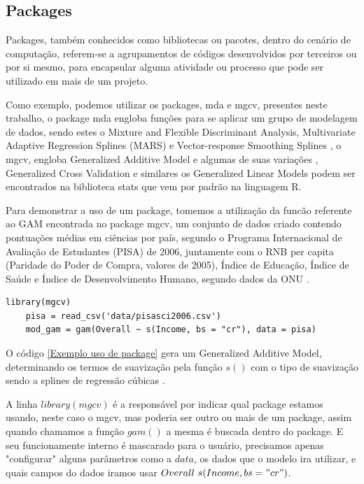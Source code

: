 \documentclass[
	12pt,				%
	openright,			%
	oneside,			%
	a4paper,			%
	english,			%
	brazil				%
	]{abntex2}
\begin{document}
\subsection{Packages}

Packages, também conhecidos como bibliotecas ou pacotes, dentro do cenário de computação, referem-se a agrupamentos de códigos 
desenvolvidos por terceiros ou por si mesmo, para encapsular alguma atividade ou processo que pode ser utilizado em mais de um projeto.

Como exemplo, podemos utilizar os packages, mda e mgcv, presentes neste trabalho, o package mda engloba funções para se aplicar
um grupo de modelagem de dados, sendo estes o Mixture and Flexible Discriminant Analysis, Multivariate Adaptive Regression 
Splines (MARS) e Vector-response Smoothing Splines \cite{mda}, o mgcv, engloba Generalized Additive Model e algumas de suas variações
, Generalized Cross Validation e similares \cite{mgcv} os Generalized Linear Models podem ser encontrados na biblioteca stats que
vem por padrão na linguagem R.

Para demonstrar a uso de um package, tomemos a utilização da funcão referente ao GAM encontrada no package mgcv, um conjunto de dados
criado contendo pontuações médias em ciências por país, segundo o Programa Internacional de Avaliação de Estudantes (PISA) de 2006,
juntamente com o RNB per capita (Paridade do Poder de Compra, valores de 2005), Índice de Educação, Índice de Saúde e 
Índice de Desenvolvimento Humano, segundo dados da ONU \cite{gam_exemplo}.

\lstset{style=r_code}
\begin{lstlisting}[caption={\label{Exemplo uso de package}Exemplo uso de package}]
	library(mgcv)
	pisa = read_csv('data/pisasci2006.csv')
	mod_gam = gam(Overall ~ s(Income, bs = "cr"), data = pisa)
\end{lstlisting}

O código \ref{Exemplo uso de package} gera um Generalized Additive Model, determinando os termos de suavização pela função $s()$ com o
tipo de suavização sendo a splines de regressão cúbicas \cite{gam_exemplo}. 

A linha $library(mgcv)$ é a responsável por indicar qual package estamos usando, neste caso o mgcv, mas poderia ser outro ou mais 
de um package, assim quando chamamos a função $gam()$ a mesma é buscada dentro do package. E seu funcionamente interno é mascarado 
para o usuário, precisamos apenas "configurar" alguns parâmetros como a $data$, os dados que o modelo ira utilizar, e quais campos 
do dados iramos usar $Overall ~ s(Income, bs = "cr")$.  
\end{document}
